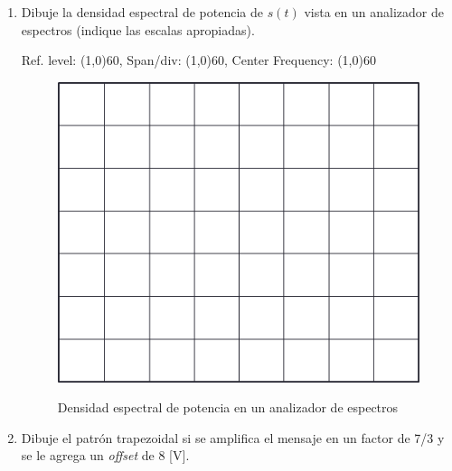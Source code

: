 \begin{enumerate}
\begin{enumerate}
		\item Dibuje la densidad espectral de potencia de $s(t)$ vista en un analizador de espectros (indique las escalas apropiadas).
		\begin{center}
			Ref. level: \line(1,0){60}, Span/div: \line(1,0){60}, Center Frequency: \line(1,0){60}
			
	\begin{figure}[h!]
		\captionsetup{justification = raggedright, singlelinecheck = false}
		\caption{Densidad espectral de potencia en un analizador de espectros} 
		\centering
		\includegraphics[scale=0.6]{Imagenes/img2.png}
		\label{fig:img2}
	\end{figure}	
		
		
			
		\end{center}
		\item Dibuje el patrón trapezoidal si se amplifica el mensaje en un factor de 7/3 y se le agrega un \textit{offset} de 8 [V].
		
		
	\end{enumerate}



\end{enumerate}
